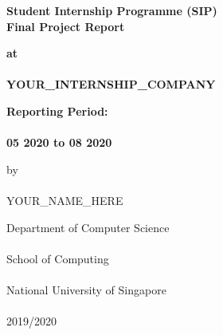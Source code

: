 \documentclass[a4paper, 12pt, fleqn]{report}
\begin{document}
\hypersetup{
linktoc=all     %
}

\begin{titlepage}
    \begin{center}
        \vspace*{1cm}

        \Large
        \textbf{Student Internship Programme (SIP) \\
        Final Project Report}

        \vspace{2cm}
        \normalsize
        \textbf{at \\
        \ \\ YOUR\_INTERNSHIP\_COMPANY}
        
        \vspace{1cm}
        \textbf{Reporting Period: \\
        \ \\ 05 2020 to 08 2020}

        \vspace{1cm}
        by \\
        \ \\ YOUR\_NAME\_HERE

        \vfill

        Department of Computer Science \\
        \ \\ School of Computing \\
        \ \\ National University of Singapore \\
        \ \\ 2019/2020

    \end{center}
\end{titlepage}
\end{document}
